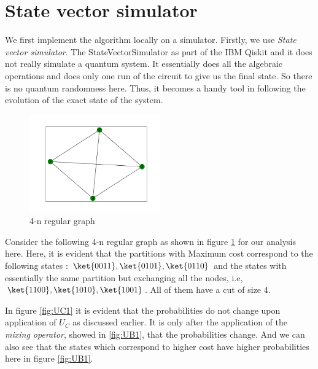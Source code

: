 \section{State vector simulator}
\label{statevector_section}
We first implement the algorithm locally on a simulator. Firstly, we use \emph{State vector simulator}.
The StateVectorSimulator as part of the IBM Qiskit and it does not really simulate a quantum system.
It essentially does all the algebraic operations and does only one run of the circuit to give us the final state.
So there is no quantum randomness here.
Thus, it becomes a handy tool in following the evolution of the exact state of the system.%

\begin{minipage}{0.5\textwidth}
    \begin{figure}[H]
    \centering
    \includegraphics[width=0.5\textwidth]{images/4ngraph.png}
    \caption{4-n regular graph}
    \label{fig:4ngraph}
    \end{figure}
\end{minipage}
\begin{minipage}{0.45\textwidth}
Consider the following 4-n regular graph as shown in figure \ref{fig:4ngraph} for our analysis here.
Here, it is evident that the partitions with Maximum cost correspond to the following states : $\ket{0011}, \ket{0101}, \ket{0110}$ and the states with essentially the same partition but exchanging all the nodes, i.e, $\ket{1100}, \ket{1010}, \ket{1001}$. All of them have a cut of size 4.
\end{minipage}

In figure \ref{fig:UC1} it is evident that the probabilities do not change upon application of $U_C$ as discussed earlier.
It is only after the application of the \emph{mixing operator}, showed in \ref{fig:UB1}, that the probabilities change.
And we can also see that the states which correspond to higher cost have higher probabilities here in figure \ref{fig:UB1}.

